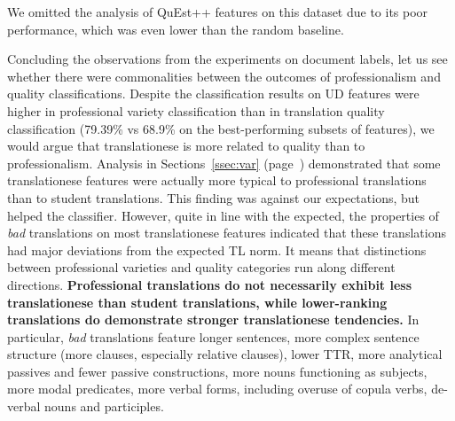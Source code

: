 We omitted the analysis of QuEst++ features on this dataset due to its poor performance, which was even lower than the random baseline.

Concluding the observations from the experiments on document labels, let us see whether there were commonalities between the outcomes of professionalism and quality classifications. Despite the classification results on UD features were higher in professional variety classification than in translation quality classification (79.39\% vs 68.9\% on the best-performing subsets of features), we would argue that translationese is more related to quality than to professionalism. Analysis in Sections~\ref{ssec:var} (page~\pageref{pg:more_professional_more_translated}) demonstrated that some translationese features were actually more typical to professional translations than to student translations. This finding was against our expectations, but helped the classifier. 
However, quite in line with the expected, the properties of \textit{bad} translations on most translationese features indicated that these translations had major deviations from the expected TL norm. %
\label{pg:bad_tendencies}
It means that distinctions between professional varieties and quality categories run along different directions. \textbf{Professional translations do not necessarily exhibit less translationese than student translations, while lower-ranking translations do demonstrate stronger translationese tendencies.} In particular, \textit{bad} translations feature longer sentences, more complex sentence structure (more clauses, especially relative clauses), lower TTR, more analytical passives and fewer passive constructions, more nouns functioning as subjects, more modal predicates, more verbal forms, including overuse of copula verbs, de-verbal nouns and participles. 


